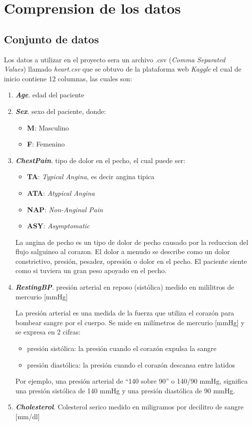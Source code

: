 \documentclass[12pt, letterpaper]{article}
\begin{document}
\section{Comprension de los datos}
\subsection{Conjunto de datos}
Los datos a utilizar en el proyecto sera un archivo .csv 
(\textit{Comma Separated Values}) llamado \textit{heart.csv} 
que se obtuvo de la plataforma web \textit{Kaggle} \cite{dataset}
el cual de inicio contiene 12 columnas, las cuales son:
\begin{enumerate}
    \item{\textbf{\textit{Age}}. edad del paciente} 
    \item{\textbf{\textit{Sex}}. sexo del paciente, donde:
    \begin{itemize}
        \item{\textbf{M}}: Masculino
        \item{\textbf{F}}: Femenino
    \end{itemize}
    }
    \item{\textbf{\textit{ChestPain}}. tipo de dolor en el pecho, el cual puede ser: 
    \begin{itemize}
        \item{\textbf{TA}}: \textit{Typical Angina}, es decir angina tipica
        \item{\textbf{ATA}}: \textit{Atypical Angina}
        \item{\textbf{NAP}}: \textit{Non-Anginal Pain}
        \item{\textbf{ASY}}: \textit{Asymptomatic}
    \end{itemize}
    La angina de pecho es un tipo de dolor de pecho causado por la reduccion del flujo
    salguineo al corazon. El dolor a menudo se describe como un dolor constrictivo, 
    presión, pesadez, opresión o dolor en el pecho. El paciente siente como si tuviera
    un gran peso apoyado en el pecho. \cite{angina}
    }
    \item{\textbf{\textit{RestingBP}}. presión arterial en reposo (sistólica)
    medido en mililitros de mercurio [mmHg]
    
    La presión arterial es una medida de la fuerza que utiliza el corazón para bombear
    sangre por el cuerpo. Se mide en milímetros de mercurio [mmHg] y se expresa en 2 cifras:
    \begin{itemize}
        \item{presión sistólica: la presión cuando el corazón expulsa la sangre}
        \item{presión diastólica: la presión cuando el corazón descansa entre latidos}
    \end{itemize}
    Por ejemplo, una presión arterial de \textquotedblleft{}140 sobre 90\textquotedblright{}
    o 140/90 mmHg, significa una presión sistólica de 140 mmHg y una presión diastólica
    de 90 mmHg. \cite{presion-arterial}
    }
    \item{\textbf{\textit{Cholesterol}}. Colesterol serico 
    medido en miligramos por decilitro de sangre [mm/dl]
    
}
\end{enumerate}
\end{document}

